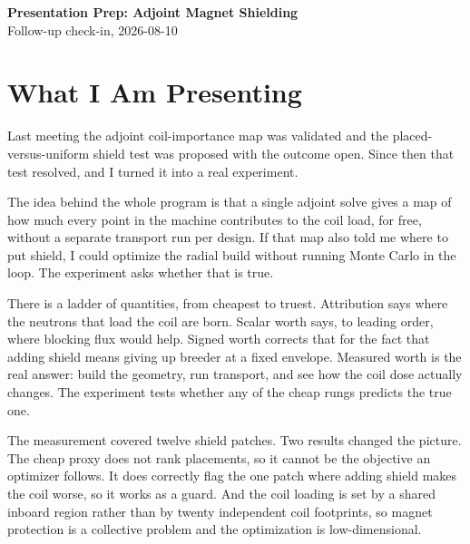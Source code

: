 \documentclass[11pt]{article}
\begin{document}
\begin{center}
  {\Large\bfseries\color{key} Presentation Prep: Adjoint Magnet Shielding} \\[2pt]
  {\normalsize Follow-up check-in, 2026-08-10}
\end{center}

\vspace{-4pt}
\section{What I Am Presenting}
Last meeting the adjoint coil-importance map was validated and the placed-versus-uniform shield test
was proposed with the outcome open. Since then that test resolved, and I turned it into a real
experiment.

The idea behind the whole program is that a single adjoint solve gives a map of how much every point
in the machine contributes to the coil load, for free, without a separate transport run per design.
If that map also told me where to put shield, I could optimize the radial build without running
Monte Carlo in the loop. The experiment asks whether that is true.

There is a ladder of quantities, from cheapest to truest. Attribution says where the neutrons that
load the coil are born. Scalar worth says, to leading order, where blocking flux would help. Signed
worth corrects that for the fact that adding shield means giving up breeder at a fixed envelope.
Measured worth is the real answer: build the geometry, run transport, and see how the coil dose
actually changes. The experiment tests whether any of the cheap rungs predicts the true one.

The measurement covered twelve shield patches. Two results changed the picture. The cheap proxy does
not rank placements, so it cannot be the objective an optimizer follows. It does correctly flag the
one patch where adding shield makes the coil worse, so it works as a guard. And the coil loading is
set by a shared inboard region rather than by twenty independent coil footprints, so magnet
protection is a collective problem and the optimization is low-dimensional.
\end{document}
